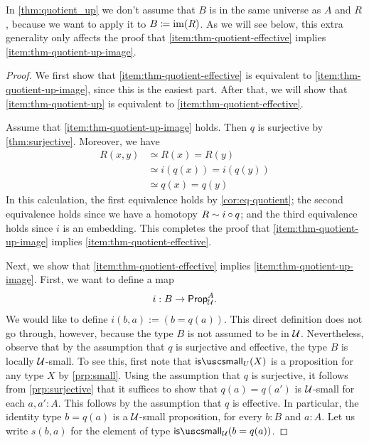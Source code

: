 In \cref{thm:quotient_up} we don't assume that $B$ is in the same universe as $A$ and $R$, because we want to apply it to $B\coloneqq\operatorname{im}(R)$. As we will see below, this extra generality only affects the proof that \ref{item:thm-quotient-effective} implies \ref{item:thm-quotient-up-image}.

\begin{proof}
  We first show that \ref{item:thm-quotient-effective} is equivalent to \ref{item:thm-quotient-up-image}, since this is the easiest part. After that, we will show that \ref{item:thm-quotient-up} is equivalent to \ref{item:thm-quotient-effective}.

  Assume that \ref{item:thm-quotient-up-image} holds. Then $q$ is surjective by \cref{thm:surjective}. Moreover, we have
  \begin{align*}
    R(x,y) & \simeq R(x)=R(y) \\
           & \simeq i(q(x))=i(q(y)) \\
           & \simeq q(x)=q(y)
  \end{align*}
  In this calculation, the first equivalence holds by \cref{cor:eq-quotient}; the second equivalence holds since we have a homotopy $R\sim i\circ q$; and the third equivalence holds since $i$ is an embedding. This completes the proof that \ref{item:thm-quotient-up-image} implies \ref{item:thm-quotient-effective}.

  Next, we show that \ref{item:thm-quotient-effective} implies \ref{item:thm-quotient-up-image}. First, we want to define a map 
  \begin{equation*}
    i:B\to\mathsf{Prop}_{\mathcal{U}}^A.
  \end{equation*}
  We would like to define $i(b,a):=(b=q(a))$. This direct definition does not go through, however, because the type $B$ is not assumed to be in $\mathcal{U}$. Nevertheless, observe that by the assumption that $q$ is surjective and effective, the type $B$ is locally $\mathcal{U}$-small. To see this, first note that $\issmall_U(X)$ is a proposition for any type $X$ by \cref{prp:small}. Using the assumption that $q$ is surjective, it follows from \cref{prp:surjective} that it suffices to show that $q(a)=q(a')$ is $\mathcal{U}$-small for each $a,a':A$. This follows by the assumption that $q$ is effective. In particular, the identity type $b=q(a)$ is a $\mathcal{U}$-small proposition, for every $b:B$ and $a:A$. Let us write $s(b,a)$ for the element of type $\issmall_\UU(b=q(a))$.


\end{proof}
